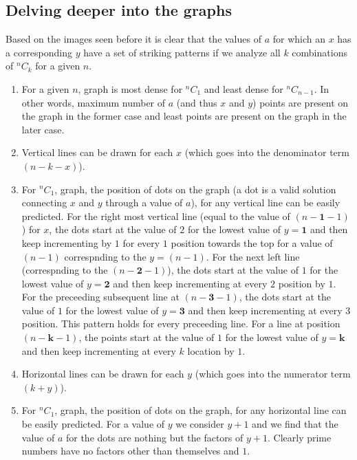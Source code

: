\documentclass[12pt, twoside]{article}
\newcommand*{\Combination}[2]{{}^{#1}C_{#2}}%
\begin{document}
\subsection{Delving deeper into the graphs}\label{Implications}
Based on the images seen before it is clear that the values of $a$ for which an $x$ has a corresponding $y$ have a set of striking patterns if we analyze all $k$ combinations of $\Combination{n}{k}$ for a given $n$. 
\begin{enumerate}
	\item For a given $n$, graph is most dense for $\Combination{n}{1}$ and least dense for $\Combination{n}{n-1}$. In other words, maximum number of $a$ (and thus $x$ and $y$) points are present on the graph in the former case and least points are present on the graph in the later case.
	\item Vertical lines can be drawn for each $x$ (which goes into the denominator term $(n-k-x)$). 
	\item For $\Combination{n}{1}$, graph, the position of dots on the graph (a dot is a valid solution connecting $x$ and $y$ through a value of $a$), for any vertical line can be easily predicted. For the right most vertical line (equal to the value of $(n-\textbf{1}-1)$) for $x$, the dots start at the value of $2$ for the lowest value of $y=\textbf{1}$ and then keep incrementing by $1$ for every \textbf{$1$} position towards the top for a value of $(n-1)$ correspnding to the $y=(n-1)$. For the next left line (correspnding to the $(n-\textbf{2}-1)$), the dots start at the value of $1$ for the lowest value of $y=\textbf{2}$ and then keep incrementing at every \textbf{$2$} position by $1$. For the preceeding subsequent line at $(n-\textbf{3}-1)$, the dots start at the value of $1$ for the lowest value of $y=\textbf{3}$ and then keep incrementing at every \textbf{$3$} position. This pattern holds for every preceeding line. For a line at position $(n-\textbf{k}-1)$, the points start at the value of $1$ for the lowest value of $y=\textbf{k}$ and then keep incrementing at every \textbf{$k$} location by $1$.
	\item Horizontal lines can be drawn for each $y$ (which goes into the numerator term $(k+y)$).
	\item For $\Combination{n}{1}$, graph, the position of dots on the graph, for any horizontal line can be easily predicted. For a value of $y$ we consider $y+1$ and we find that the value of $a$ for the dots are nothing but the factors of $y+1$. Clearly prime numbers have no factors other than themselves and $1$.

\end{enumerate}
\end{document}
